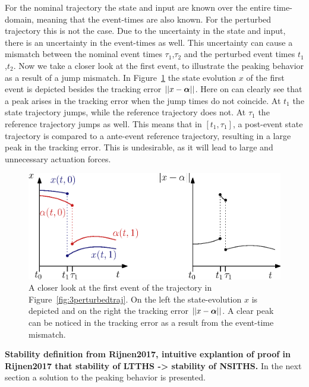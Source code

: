 \documentclass[../DC2017114Bouma.tex]{subfiles}
\begin{document}
For the nominal trajectory the state and input are known over the entire time-domain, meaning that the event-times are also known. For the perturbed trajectory this is not the case. Due to the uncertainty in the state and input, there is an uncertainty in the event-times as well. This uncertainty can cause a mismatch between the nominal event times $\tau_1$,$\tau_2$ and the perturbed event times $t_1$,$t_2$. Now we take a closer look at the first event, to illustrate the peaking behavior as a result of a jump mismatch. In Figure~\ref{fig:3peakerror} the state evolution $x$ of the first event is depicted besides the tracking error $||x-\boldsymbol{\alpha}||$. Here on can clearly see that a peak arises in the tracking error when the jump times do not coincide. At $t_1$ the state trajectory jumps, while the reference trajectory does not. At $\tau_1$ the reference trajectory jumps as well. This means that in $[t_1,\tau_1]$, a post-event state trajectory is compared to a ante-event reference trajectory, resulting in a large peak in the tracking error. This is undesirable, as it will lead to large and unnecessary actuation forces.
\begin{figure}[h]
\centering
\includegraphics[width=.66\textwidth]{peakerror.eps}\caption{A closer look at the first event of the trajectory in Figure~\ref{fig:3perturbedtraj}. On the left the state-evolution $x$ is depicted and on the right the tracking error $||x-\boldsymbol{\alpha}||$. A clear peak can be noticed in the tracking error as a result from the event-time mismatch.} \label{fig:3peakerror}
\end{figure}

\textbf{Stability definition from Rijnen2017, intuitive explantion of proof in Rijnen2017 that stability of LTTHS -> stability of NSITHS.} In the next section a solution to the peaking behavior is presented.
%
%
%
%
%
\end{document}
